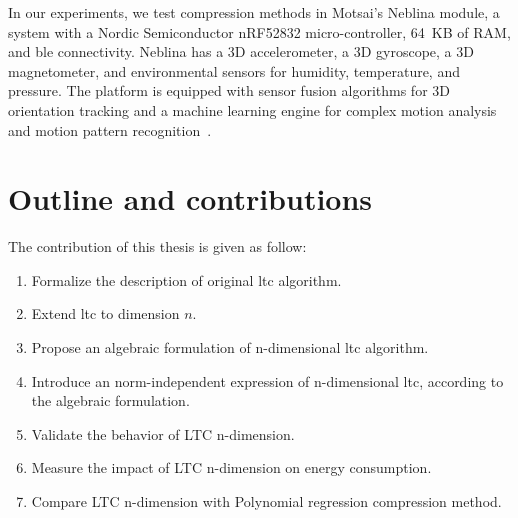 
In our experiments, we test compression methods in Motsai's Neblina module, a
system with a Nordic Semiconductor nRF52832 micro-controller, 64~KB of RAM, and
\acrlong{ble} connectivity. Neblina has a 3D accelerometer, a 3D
gyroscope, a 3D magnetometer, and environmental sensors for humidity,
temperature, and pressure. The platform is equipped with sensor fusion algorithms
for 3D orientation tracking and a machine learning engine for complex motion
analysis and motion pattern recognition~\cite{sarbishei2016accuracy}.


\section{Outline and contributions}





The contribution of this thesis is given as follow:
\begin{enumerate}
  \item Formalize the description of original \acrshort{ltc} algorithm.
  \item Extend \acrshort{ltc} to dimension $n$.
  \item Propose an algebraic formulation of n-dimensional \acrshort{ltc}
  algorithm.
  \item Introduce an norm-independent expression of n-dimensional
  \acrshort{ltc}, according to the algebraic formulation.
  \item Validate the behavior of LTC n-dimension.
  \item Measure the impact of LTC n-dimension on energy consumption.
  \item Compare LTC n-dimension with Polynomial regression compression method.
\end{enumerate}

